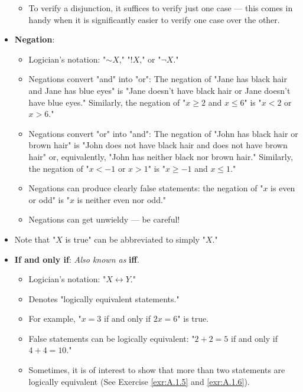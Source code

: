 \documentclass[../main.tex]{subfiles}
\begin{document}
\begin{itemize}
\begin{itemize}
        \item To verify a disjunction, it suffices to verify just one case --- this comes in handy when it is significantly easier to verify one case over the other.
    \end{itemize}
    \item \textbf{Negation}: 
    \begin{itemize}
        \item Logician's notation: "$\sim X$," "$!X$," or "$\neg X$."
        \item Negations convert "and" into "or": The negation of "Jane has black hair and Jane has blue eyes" is "Jane doesn't have black hair or Jane doesn't have blue eyes." Similarly, the negation of "$x\geq 2$ and $x\leq 6$" is "$x<2$ or $x>6$."
        \item Negations convert "or" into "and": The negation of "John has black hair or brown hair" is "John does not have black hair and does not have brown hair" or, equivalently, "John has neither black nor brown hair." Similarly, the negation of "$x<-1$ or $x>1$" is "$x\geq -1$ and $x\leq 1$."
        \item Negations can produce clearly false statements: the negation of "$x$ is even or odd" is "$x$ is neither even nor odd."
        \item Negations can get unwieldy --- be careful!
    \end{itemize}
    \item Note that "$X$ is true" can be abbreviated to simply "$X$."
    \item \textbf{If and only if}:  \emph{Also known as} \textbf{iff}.
    \begin{itemize}
        \item Logician's notation: "$X\leftrightarrow Y$."
        \item Denotes "logically equivalent statements."
        \item For example, "$x=3$ if and only if $2x=6$" is true.
        \item False statements can be logically equivalent: "$2+2=5$ if and only if $4+4=10$."
        \item Sometimes, it is of interest to show that more than two statements are logically equivalent (See Exercise \ref{exr:A.1.5} and \ref{exr:A.1.6}).
    \end{itemize}
\end{itemize}
\end{document}
